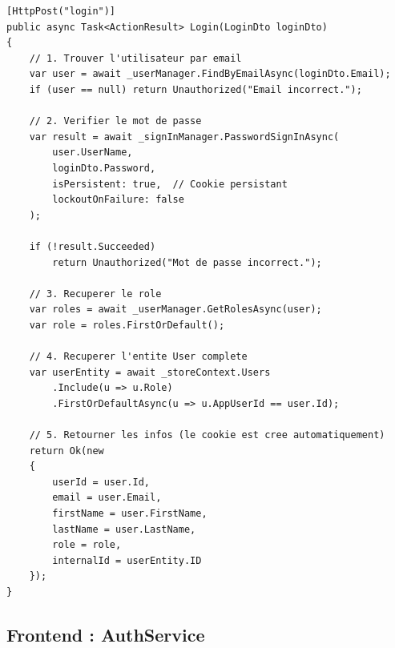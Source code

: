 \documentclass[12pt,a4paper]{article}
\begin{document}
\begin{lstlisting}[language=CSharp, caption=Login avec Cookie Authentication]
[HttpPost("login")]
public async Task<ActionResult> Login(LoginDto loginDto)
{
    // 1. Trouver l'utilisateur par email
    var user = await _userManager.FindByEmailAsync(loginDto.Email);
    if (user == null) return Unauthorized("Email incorrect.");

    // 2. Verifier le mot de passe
    var result = await _signInManager.PasswordSignInAsync(
        user.UserName, 
        loginDto.Password, 
        isPersistent: true,  // Cookie persistant
        lockoutOnFailure: false
    );
    
    if (!result.Succeeded) 
        return Unauthorized("Mot de passe incorrect.");

    // 3. Recuperer le role
    var roles = await _userManager.GetRolesAsync(user);
    var role = roles.FirstOrDefault();

    // 4. Recuperer l'entite User complete
    var userEntity = await _storeContext.Users
        .Include(u => u.Role)
        .FirstOrDefaultAsync(u => u.AppUserId == user.Id);

    // 5. Retourner les infos (le cookie est cree automatiquement)
    return Ok(new
    {
        userId = user.Id,
        email = user.Email,
        firstName = user.FirstName,
        lastName = user.LastName,
        role = role,
        internalId = userEntity.ID
    });
}
\end{lstlisting}

\subsection{Frontend : AuthService}
\end{document}
